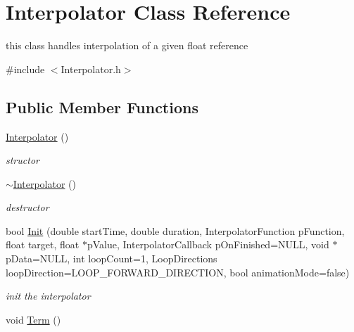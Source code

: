 \hypertarget{class_interpolator}{\section{Interpolator Class Reference}
\label{class_interpolator}
}


this class handles interpolation of a given float reference  




{\ttfamily \#include $<$Interpolator.\-h$>$}

\subsection*{Public Member Functions}
\begin{DoxyCompactItemize}
\item 
\hypertarget{class_interpolator_ab8cbb0b13436fc54a4bba03804ae8f8a}{\hyperlink{class_interpolator_ab8cbb0b13436fc54a4bba03804ae8f8a}{Interpolator} ()}\label{class_interpolator_ab8cbb0b13436fc54a4bba03804ae8f8a}

\begin{DoxyCompactList}\small\item\em structor \end{DoxyCompactList}\item 
\hypertarget{class_interpolator_a6bb406dfe33e06296ccf24f18abcd46c}{\hyperlink{class_interpolator_a6bb406dfe33e06296ccf24f18abcd46c}{$\sim$\-Interpolator} ()}\label{class_interpolator_a6bb406dfe33e06296ccf24f18abcd46c}

\begin{DoxyCompactList}\small\item\em destructor \end{DoxyCompactList}\item 
\hypertarget{class_interpolator_a967d79aa718681f0d78d45f766c241de}{bool \hyperlink{class_interpolator_a967d79aa718681f0d78d45f766c241de}{Init} (double start\-Time, double duration, Interpolator\-Function p\-Function, float target, float $\ast$p\-Value, Interpolator\-Callback p\-On\-Finished=N\-U\-L\-L, void $\ast$p\-Data=N\-U\-L\-L, int loop\-Count=1, Loop\-Directions loop\-Direction=L\-O\-O\-P\-\_\-\-F\-O\-R\-W\-A\-R\-D\-\_\-\-D\-I\-R\-E\-C\-T\-I\-O\-N, bool animation\-Mode=false)}\label{class_interpolator_a967d79aa718681f0d78d45f766c241de}

\begin{DoxyCompactList}\small\item\em init the interpolator \end{DoxyCompactList}\item 
\hypertarget{class_interpolator_aa542a0e55d33f2ac7693881309cfd957}{void \hyperlink{class_interpolator_aa542a0e55d33f2ac7693881309cfd957}{Term} ()}\label{class_interpolator_aa542a0e55d33f2ac7693881309cfd957}


\end{DoxyCompactItemize}
